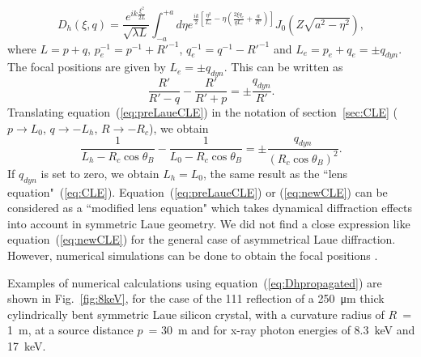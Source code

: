 \documentclass[preprint]{iucr}              %
\newcommand{\inred}[1]{{\color{red}#1}}
\begin{document}
\begin{equation}
\label{eq:Dhpropagated}
    D_h(\xi,q)=
    \frac{e^{i k \frac{\xi^2}{2L}}}{\sqrt{\lambda L}}
    \int_{-a}^{+a} d\eta
    e^{\frac{ik}{2}
    [\frac{\eta^2}{L_e}-\eta(
    \frac{2\xi q_e}{q L_e}+
    \frac{a}{R'}
    )]}
    J_0(Z\sqrt{a^2-\eta^2}),
\end{equation}
where $L=p+q$, $p_e^{-1}=p^{-1}+R'^{-1}$, $q_e^{-1}=q^{-1}-R'^{-1}$ and $L_e=p_e+q_e=\pm q_{dyn}$. The focal positions are given by $L_{e}=\pm q_{dyn}$.
This can be written as
\begin{equation}
\label{eq:preLaueCLE}
    \frac{R'}{R'-q} - \frac{R'}{R' + p} = \pm \frac{q_{dyn}}{R'}.
\end{equation}
Translating equation~(\ref{eq:preLaueCLE}) in the notation of section~\ref{sec:CLE} ($p \to L_0$, $q \to -L_h$, $R \to -R_c$), we obtain
\begin{equation}
\label{eq:newCLE}
    \frac{1}{L_h-R_c \cos\theta_B} -
    \frac{1}{L_0 - R_c \cos\theta_B} =
    \pm \frac{q_{dyn}}{(R_c \cos\theta_B)^2}.
\end{equation}
If $q_{dyn}$ is set to zero, we obtain $L_h=L_0$, the same result as the ``lens equation"~(\ref{eq:CLE}).
Equation~(\ref{eq:preLaueCLE}) or (\ref{eq:newCLE}) can be considered as a ``modified lens equation" which takes dynamical diffraction effects into account in symmetric Laue geometry.
We \inred{did} not find a close expression like equation~(\ref{eq:newCLE}) for the general case of asymmetrical Laue diffraction. However, numerical simulations can be done to obtain the focal positions \cite{GuigayFerrero2016, Nesterets}.

Examples of numerical calculations \inred{using equation~(\ref{eq:Dhpropagated})} are shown in Fig.~\ref{fig:8keV}, for the case of the 111 reflection of a \SI{250}{\micro\meter} thick cylindrically bent symmetric Laue silicon crystal, with a curvature radius of $R$~= \SI{1}{\meter}, at a source distance $p$~= \SI{30}{\meter} and for x-ray photon energies of 8.3~keV and 17~keV. 
\end{document}
